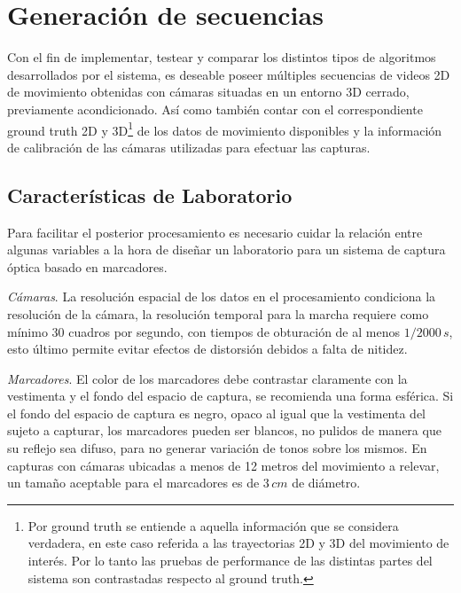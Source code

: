 \section{Generación de secuencias} 
\label{section_base_de_datos}
Con el fin de implementar, testear y comparar los distintos tipos de algoritmos desarrollados por el sistema, es deseable poseer  múltiples secuencias de videos 2D de movimiento obtenidas
con cámaras situadas en un entorno 3D cerrado, previamente acondicionado. Así como también contar con el correspondiente ground truth 2D y 3D\footnote{Por ground truth se entiende a aquella información que se considera verdadera, en este caso referida a las trayectorias 2D y 3D del movimiento de interés. Por lo tanto las pruebas de performance de las distintas partes del sistema son contrastadas respecto al ground truth.} de los datos de movimiento disponibles y la información de calibración de las cámaras utilizadas para efectuar las capturas.
\vspace{-0.3cm} 
\subsection{Características de Laboratorio}
\label{seccion_Caracteristicas_Laboratorio}
Para facilitar el posterior procesamiento es necesario cuidar la relación entre algunas variables a la hora de diseñar un laboratorio para un sistema de captura óptica basado en marcadores.
%

\textit{Cámaras}. La resolución espacial de los datos en el procesamiento condiciona la resolución de la cámara, la resolución temporal para la marcha requiere como mínimo 30 cuadros por segundo, con tiempos de obturación de al menos $1/2000\, s$, esto último permite evitar efectos de distorsión debidos a falta de nitidez.


\textit{Marcadores}. El color de los  marcadores debe contrastar claramente con la vestimenta y el fondo del espacio de captura, se recomienda una forma esférica. Si el fondo del espacio de captura es negro, opaco al igual que la vestimenta del sujeto a capturar, los marcadores pueden ser blancos, no pulidos de manera que su reflejo sea difuso, para no generar variación de tonos sobre los mismos. En capturas con cámaras ubicadas a menos de 12 metros del movimiento a relevar, un tamaño aceptable para el marcadores es de $3\,cm$ de diámetro.


